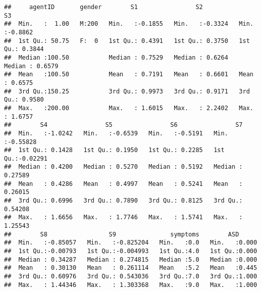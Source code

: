 \documentclass[]{article}
\newenvironment{Shaded}{\begin{snugshade}}{\end{snugshade}}
\newcommand{\KeywordTok}[1]{\textcolor[rgb]{0.13,0.29,0.53}{\textbf{#1}}}
\newcommand{\DecValTok}[1]{\textcolor[rgb]{0.00,0.00,0.81}{#1}}
\newcommand{\StringTok}[1]{\textcolor[rgb]{0.31,0.60,0.02}{#1}}
\newcommand{\CommentTok}[1]{\textcolor[rgb]{0.56,0.35,0.01}{\textit{#1}}}
\newcommand{\OperatorTok}[1]{\textcolor[rgb]{0.81,0.36,0.00}{\textbf{#1}}}
\newcommand{\NormalTok}[1]{#1}
\begin{document}
\begin{verbatim}
##     agentID       gender        S1                S2                S3         
##  Min.   :  1.00   M:200   Min.   :-0.1855   Min.   :-0.3324   Min.   :-0.8862  
##  1st Qu.: 50.75   F:  0   1st Qu.: 0.4391   1st Qu.: 0.3750   1st Qu.: 0.3844  
##  Median :100.50           Median : 0.7529   Median : 0.6264   Median : 0.6579  
##  Mean   :100.50           Mean   : 0.7191   Mean   : 0.6601   Mean   : 0.6575  
##  3rd Qu.:150.25           3rd Qu.: 0.9973   3rd Qu.: 0.9171   3rd Qu.: 0.9580  
##  Max.   :200.00           Max.   : 1.6015   Max.   : 2.2402   Max.   : 1.6757  
##        S4                S5                S6                S7          
##  Min.   :-1.0242   Min.   :-0.6539   Min.   :-0.5191   Min.   :-0.55828  
##  1st Qu.: 0.1428   1st Qu.: 0.1950   1st Qu.: 0.2285   1st Qu.:-0.02291  
##  Median : 0.4200   Median : 0.5270   Median : 0.5192   Median : 0.27589  
##  Mean   : 0.4286   Mean   : 0.4997   Mean   : 0.5241   Mean   : 0.26015  
##  3rd Qu.: 0.6996   3rd Qu.: 0.7890   3rd Qu.: 0.8125   3rd Qu.: 0.54208  
##  Max.   : 1.6656   Max.   : 1.7746   Max.   : 1.5741   Max.   : 1.25543  
##        S8                 S9               symptoms        ASD       
##  Min.   :-0.85057   Min.   :-0.825204   Min.   :0.0   Min.   :0.000  
##  1st Qu.:-0.00793   1st Qu.:-0.004993   1st Qu.:4.0   1st Qu.:0.000  
##  Median : 0.34287   Median : 0.274815   Median :5.0   Median :0.000  
##  Mean   : 0.30130   Mean   : 0.261114   Mean   :5.2   Mean   :0.445  
##  3rd Qu.: 0.60976   3rd Qu.: 0.543036   3rd Qu.:7.0   3rd Qu.:1.000  
##  Max.   : 1.44346   Max.   : 1.303368   Max.   :9.0   Max.   :1.000
\end{verbatim}

\begin{Shaded}
\end{Shaded}
\end{document}
